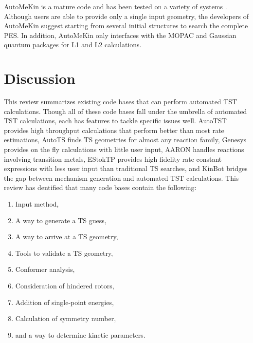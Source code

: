 \documentclass[preprint, 11pt]{elsarticle} %
\begin{document}
AutoMeKin is a mature code and has been tested on a variety of systems .
Although users are able to provide only a single input geometry, the developers of AutoMeKin suggest starting from several initial structures to search the complete PES.
In addition, AutoMeKin only interfaces with the MOPAC and Gaussian quantum packages for L1 and L2 calculations.





\section{Discussion}
%

This review summarizes existing code bases that can perform automated TST calculations.
Though all of these code bases fall under the umbrella of automated TST calculations, each has features to tackle specific issues well.
AutoTST provides high throughput calculations that perform better than most rate estimations, AutoTS finds TS geometries for almost any reaction family, Genesys provides on the fly calculations with little user input, AARON handles reactions involving transition metals, EStokTP provides high fidelity rate constant expressions with less user input than traditional TS searches, and KinBot bridges the gap between mechanism generation and automated TST calculations. 
This review has dentified that many code bases contain the following:
\begin{enumerate}
    \item Input method,
    \item A way to generate a TS guess,
    \item A way to arrive at a TS geometry,
    \item Tools to validate a TS geometry,
    \item Conformer analysis,
    \item Consideration of hindered rotors,
    \item Addition of single-point energies,
    \item Calculation of symmetry number,
    \item and a way to determine kinetic parameters.
\end{enumerate}
\end{document}
